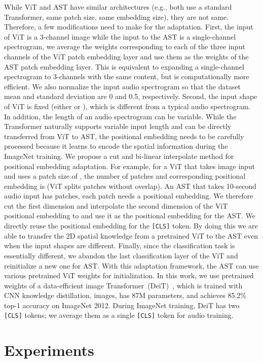 \documentclass[a4paper]{article}
\begin{document}
While ViT and AST have similar architectures (e.g., both use a standard Transformer, same patch size, same embedding size), they are not same. Therefore, a few modifications need to make for the adaptation. First, the input of ViT is a 3-channel image while the input to the AST is a single-channel spectrogram, we average the weights corresponding to each of the three input channels of the ViT patch embedding layer and use them as the weights of the AST patch embedding layer. This is equivalent to expanding a single-channel spectrogram to 3-channels with the same content, but is computationally more efficient. We also normalize the input audio spectrogram so that the dataset mean and standard deviation are 0 and 0.5, respectively. Second, the input shape of ViT is fixed (either  or ), which is different from a typical audio spectrogram. In addition, the length of an audio spectrogram can be variable. While the Transformer naturally supports variable input length and can be directly transferred from ViT to AST, the positional embedding needs to be carefully processed because it learns to encode the spatial information during the ImageNet training. We propose a cut and bi-linear interpolate method for positional embedding adaptation. For example, for a ViT that takes  image input and uses a patch size of , the number of patches and corresponding positional embedding is  (ViT splits patches without overlap). An AST that takes 10-second audio input has  patches, each patch needs a positional embedding. We therefore cut the first dimension and interpolate the second dimension of the  ViT positional embedding to  and use it as the positional embedding for the AST. We directly reuse the positional embedding for the \texttt{[CLS]} token. By doing this we are able to transfer the 2D spatial knowledge from a pretrained ViT to the AST even when the input shapes are different. Finally, since the classification task is essentially different, we abandon the last classification layer of the ViT and reinitialize a new one for AST. With this adaptation framework, the AST can use various pretrained ViT weights for initialization. In this work, we use pretrained weights of a data-efficient image Transformer~(DeiT)~\cite{touvron2020deit}, which is trained with CNN knowledge distillation,  images, has 87M parameters, and achieves 85.2\% top-1 accuracy on ImageNet 2012. During ImageNet training, DeiT has two \texttt{[CLS]} tokens; we average them as a single \texttt{[CLS]} token for audio training.


\section{Experiments}
\end{document}
